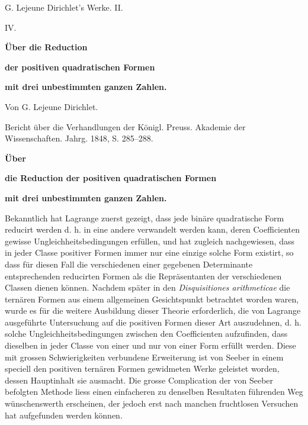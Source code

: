 \documentclass[11pt]{article}
\begin{document}
\begin{center}
{\Large G. Lejeune Dirichlet's Werke. II.}\par\vspace{1.5em}
{\Large IV.}\par\vspace{0.5em}
{\LARGE \textbf{Über die Reduction}}\par
{\LARGE \textbf{der positiven quadratischen Formen}}\par
{\LARGE \textbf{mit drei unbestimmten ganzen Zahlen.}}\par\vspace{1em}
{\large Von G. Lejeune Dirichlet.}\par\vspace{0.5em}
{\small Bericht über die Verhandlungen der Königl. Preuss. Akademie der Wissenschaften. Jahrg. 1848, S. 285--288.}
\end{center}

\begin{center}
\textbf{Über}\par
\textbf{die Reduction der positiven quadratischen Formen}\par
\textbf{mit drei unbestimmten ganzen Zahlen.}
\end{center}

Bekanntlich hat Lagrange zuerst gezeigt, dass jede binäre quadratische Form reducirt werden d. h. in eine andere verwandelt werden kann, deren Coefficienten gewisse Ungleichheitsbedingungen erfüllen, und hat zugleich nachgewiesen, dass in jeder Classe positiver Formen immer nur eine einzige solche Form existirt, so dass für diesen Fall die verschiedenen einer gegebenen Determinante entsprechenden reducirten Formen als die Repräsentanten der verschiedenen Classen dienen können. Nachdem später in den \emph{Disquisitiones arithmeticae} die ternären Formen aus einem allgemeinen Gesichtspunkt betrachtet worden waren, wurde es für die weitere Ausbildung dieser Theorie erforderlich, die von Lagrange ausgeführte Untersuchung auf die positiven Formen dieser Art auszudehnen, d. h. solche Ungleichheitsbedingungen zwischen den Coefficienten aufzufinden, dass dieselben in jeder Classe von einer und nur von einer Form erfüllt werden. Diese mit grossen Schwierigkeiten verbundene Erweiterung ist von Seeber in einem speciell den positiven ternären Formen gewidmeten Werke geleistet worden, dessen Hauptinhalt sie ausmacht. Die grosse Complication der von Seeber befolgten Methode liess einen einfacheren zu denselben Resultaten führenden Weg wünschenswerth erscheinen, der jedoch erst nach manchen fruchtlosen Versuchen hat aufgefunden werden können.
\end{document}
